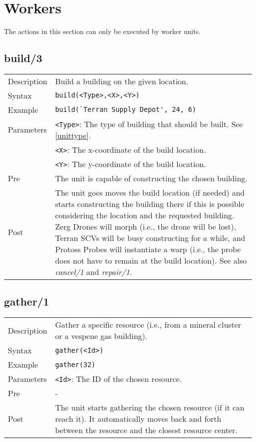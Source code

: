 \pagebreak

\section{Workers}
The actions in this section can only be executed by worker units.

\subsection{build/3}
\begin{tabularx}{\textwidth}{lX}
 Description & Build a building on the given location. \\
 Syntax & \verb|build(<Type>,<X>,<Y>)| \\
 Example & \verb|build(`Terran Supply Depot', 24, 6)| \\
 Parameters & \verb|<Type>|: The type of building that should be built. See \ref{unittype}. \\
            & \verb|<X>|: The x-coordinate of the build location. \\
            & \verb|<Y>|: The y-coordinate of the build location. \\
 Pre & The unit is capable of constructing the chosen building. \\
 Post & The unit goes moves the build location (if needed) and starts constructing the building there if this is possible considering the location and the requested building. Zerg Drones will morph (i.e., the drone will be lost), Terran SCVs will be busy constructing for a while, and Protoss Probes will instantiate a warp (i.e., the probe does not have to remain at the build location). See also \textit{cancel/1} and \textit{repair/1}.
\end{tabularx}

\subsection{gather/1}
\begin{tabularx}{\textwidth}{lX}
 Description & Gather a specific resource (i.e., from a mineral cluster or a vespene gas building). \\
 Syntax & \verb|gather(<Id>)| \\
 Example & \verb|gather(32)| \\
 Parameters & \verb|<Id>|: The ID of the chosen resource. \\
 Pre & - \\
 Post & The unit starts gathering the chosen resource (if it can reach it). It automatically moves back and forth between the resource and the closest resource center.
\end{tabularx}

